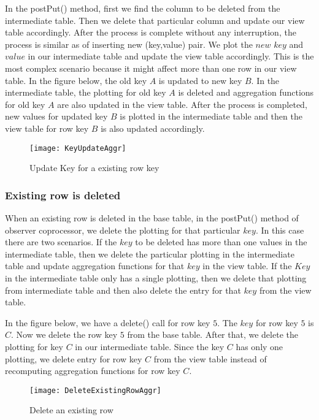 \documentclass[11pt,a4paper,bibtotoc,idxtotoc,headsepline,footsepline,footexclude,BCOR12mm,DIV13]{scrbook}
\begin{document}
In the postPut() method, first we find the column to be deleted from the intermediate table. Then we delete that particular column and update our view table accordingly. After the process is complete without any interruption, the process is similar as of inserting new (key,value) pair. We plot the $new$ $key$ and $value$ in our intermediate table and update the view table accordingly. This is the most complex scenario because it might affect more than one row in our view table. In the figure below, the old key $A$ is updated to new key $B$. In the intermediate table, the plotting for old key $A$ is deleted and aggregation functions for old key $A$ are also updated in the view table. After the process is completed, new values for updated key $B$ is plotted in the intermediate table and then the view table for row key $B$ is also updated accordingly.

\begin{figure}
	\centering
	\texttt{[image: KeyUpdateAggr]}
	\caption{Update Key for a existing row key}
	\label{sec:updateKeyforexistingrow}
	
\end{figure} 

\newpage
\subsubsection{Existing row is deleted}
\label{subsubsec:rowdelete}
When an existing row is deleted in the base table, in the postPut() method of observer coprocessor, we delete the plotting for that particular $key$. In this case there are two scenarios. If the $key$ to be deleted has more than one values in the intermediate table, then we delete the particular plotting in the intermediate table and update aggregation functions for that $key$ in the view table. If the $Key$ in the intermediate table only has a single plotting, then we delete that plotting from intermediate table and then also delete the entry for that $key$ from the view table.

In the figure below, we have a delete() call for row key $5$. The $key$ for row key $5$ is $C$. Now we delete the row key $5$ from the base table. After that, we delete the plotting for key $C$ in our intermediate table. Since the key $C$ has only one plotting, we delete entry for row key $C$ from the view table instead of recomputing aggregation functions for row key $C$. 

\begin{figure}
	\centering
	\texttt{[image: DeleteExistingRowAggr]}
	\caption{Delete an existing row}
	\label{sec:deleteexistingrow}
	
\end{figure} 
\end{document}

